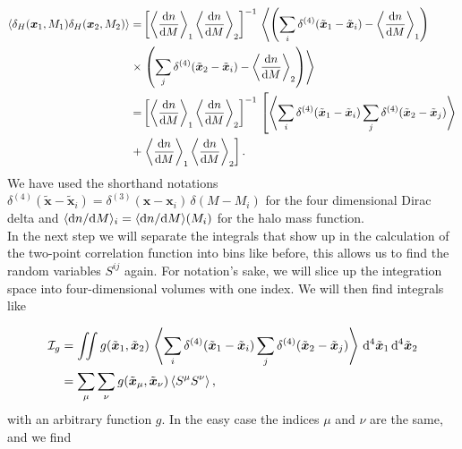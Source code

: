 \documentclass[../main.tex]{subfiles}
\begin{document}
\begin{align}
    \label{eq:two-point-halo-seed-denstiy-correlation}
    \langle \delta_H(\boldsymbol{x}_1,M_1) \delta_H(\boldsymbol{x}_2,M_2) \rangle =& \left[\left\langle  \frac{\mathrm{d} n}{\mathrm{d} M} \right\rangle_1\left\langle  \frac{\mathrm{d} n}{\mathrm{d} M} \right\rangle_2\right]^{-1}\,\left\langle\left(\sum_i \delta^{(4)}(\tilde{\boldsymbol{x}}_1-\tilde{\boldsymbol{x}}_i) - \left\langle  \frac{\mathrm{d} n}{\mathrm{d} M} \right\rangle_1\right) \right. \\
\times& \left.\left(\sum_j \delta^{(4)}(\tilde{\boldsymbol{x}}_2-\tilde{\boldsymbol{x}}_i) - \left\langle  \frac{\mathrm{d} n}{\mathrm{d} M} \right\rangle_2\right) \right\rangle \nonumber\\
=& \left[\left\langle  \frac{\mathrm{d} n}{\mathrm{d} M} \right\rangle_1\left\langle  \frac{\mathrm{d} n}{\mathrm{d} M} \right\rangle_2\right]^{-1}\,\left[\left\langle\sum_i \delta^{(4)}(\tilde{\boldsymbol{x}}_1-\tilde{\boldsymbol{x}}_i)\sum_j \delta^{(4)}(\tilde{\boldsymbol{x}}_2-\tilde{\boldsymbol{x}}_j)\right\rangle \right. \\
+&\left. \left\langle  \frac{\mathrm{d} n}{\mathrm{d} M} \right\rangle_1\left\langle  \frac{\mathrm{d} n}{\mathrm{d} M} \right\rangle_2\right]. \nonumber
\end{align}
We have used the shorthand notations $\delta^{(4)}(\tilde{\boldsymbol{x}}-\tilde{\boldsymbol{x}}_i) = \delta^{(3)}({\boldsymbol{x}}-{\boldsymbol{x}}_i)\,\delta(M-M_i)$ for the four dimensional Dirac delta and $\langle {\mathrm{d}n}/{\mathrm{d} M} \rangle_i = \langle  {\mathrm{d}n}/{\mathrm{d} M}\rangle(M_i)$ for the halo mass function.\\
In the next step we will separate the integrals that show up in the calculation of the two-point correlation function into bins like before, this allows us to find the random variables $S^{ij}$ again. For notation's sake, we will slice up the integration space into four-dimensional volumes with one index. We will then find integrals like

\begin{align}
    \mathcal{I}_g &= \iint g(\tilde{\boldsymbol{x}}_1,\tilde{\boldsymbol{x}}_2)\,\left\langle\sum_i \delta^{(4)}(\tilde{\boldsymbol{x}}_1-\tilde{\boldsymbol{x}}_i)\sum_j \delta^{(4)}(\tilde{\boldsymbol{x}}_2-\tilde{\boldsymbol{x}}_j)\right\rangle\, \mathrm{d}^4\tilde{\boldsymbol{x}}_1 \, \mathrm{d}^4\tilde{\boldsymbol{x}}_2 \label{eq:start_derivation_dirac}\\
                &= \sum_\mu \sum_\nu g(\tilde{\boldsymbol{x}}_\mu,\tilde{\boldsymbol{x}}_\nu) \left\langle S^\mu S^\nu \right\rangle,
\end{align} 
with an arbitrary function $g$. In the easy case the indices $\mu$ and $\nu$ are the same, and we find 
\end{document}
